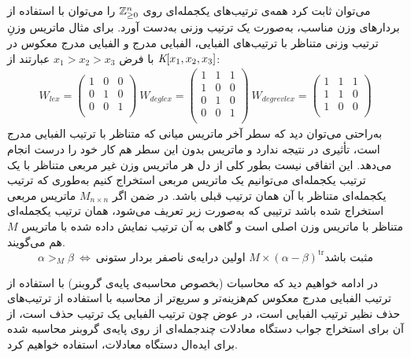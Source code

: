 \begin{example}
	می‌توان ثابت کرد همه‌ی ترتیب‌های یکجمله‌ای روی 
	$\mathbb{Z}_{\geq 0}^{n}$
	را می‌توان با  استفاده از بردارهای وزن مناسب، به‌صورت یک ترتیب وزنی به‌دست  آورد. برای مثال ماتریس وزنِ ترتیب وزنی متناظر با ترتیب‌های الفبایی، الفبایی مدرج و الفبایی مدرج معکوس در 
	$\textit{K}[x_{1},x_{2},x_{3}]$
	با فرض 
	$x_{1}>x_{2}>x_{3}$
	عبارتند از:
	\begin{align*}
	W_{lex} = \begin{pmatrix}
	1&0&0\\
	0&1&0\\
	0&0&1\\
	\end{pmatrix} \ 
	W_{deglex} = \begin{pmatrix}
	1&1&1\\
	1&0&0\\
	0&1&0\\
	0&0&1\\
	\end{pmatrix} \ 
	W_{degrevlex} = \begin{pmatrix}
	1&1&1\\
	1&1&0\\
	1&0&0\\
	\end{pmatrix}
	\end{align*}
به‌راحتی می‌توان دید که سطر آخر ماتریس  میانی که متناظر با ترتیب الفبایی مدرج است، تأثیری در نتیجه ندارد و ماتریس بدون این سطر هم کار خود را درست انجام می‌دهد. این اتفاقی نیست بطور کلی از دل هر ماتریس وزن غیر مربعی متناظر با یک ترتیب یکجمله‌ای می‌توانیم یک ماتریس مربعی استخراج کنیم به‌طوری که ترتیب یکجمله‌ای متناظر با آن همان ترتیب قبلی باشد. در ضمن اگر 
$M_{n\times n}$
ماتریس مربعی استخراج شده باشد ترتیبی که به‌صورت زیر تعریف می‌شود، همان ترتیب یکجمله‌ای متناظر با ماتریس وزن اصلی است و گاهی به آن ترتیب نمایش داده شده با ماتریس 
$M$
هم می‌گویند.
$$\alpha >_{M} \beta \ \iff \ \text{اولین  درایه‌ی ناصفر بردار ستونی $M\times(\alpha - \beta)^{\mathrm{tr}}$
	مثبت باشد} $$
\end{example}


در ادامه خواهیم دید که محاسبات (بخصوص محاسبه‌ی پایه‌ی گروبنر) با استفاده از ترتیب الفبایی مدرج معکوس  کم‌هزینه‌تر  و سریع‌تر از محاسبه با استفاده از ترتیب‌های حذف نظیر ترتیب الفبایی است، در عوض  چون ترتیب الفبایی یک ترتیب حذف است، از آن برای استخراج جواب دستگاه معادلات چندجمله‌ای از روی پایه‌ی گروبنر محاسبه شده برای ایده‌ال دستگاه معادلات، استفاده خواهیم کرد. 

